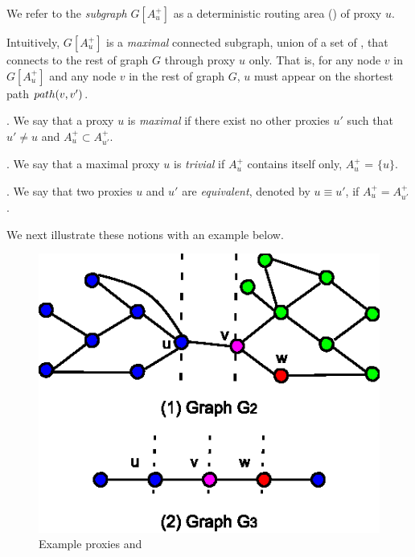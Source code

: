 We refer to the {\em subgraph} $G[A^+_u]$ as a deterministic routing area (\dra) of proxy $u$.

Intuitively, \dra $G[A^+_u]$ is a {\em maximal} connected subgraph, union of a set of \ccs, that connects to the rest of graph $G$ through proxy $u$ only.
That is, for any node $v$ in $G[A^+_u]$ and any node $v$ in the rest of graph $G$, $u$ must appear on the shortest path $\path(v, v')$.

.  We say that a proxy $u$ is {\em maximal} if there exist no other proxies $u'$ such that $u'\ne u$ and $A^+_{u} \subset A^+_{u'}$.

. We say that a maximal proxy $u$ is {\em trivial} if $A^+_u$ contains itself only, \ie $A^+_{u}$ = $\{u\}$.


. We say that two proxies $u$ and $u'$ are {\em equivalent}, denoted by $u\equiv u'$, if $A^+_{u} = A^+_{u'}$.




We next illustrate these notions with an example below.

\begin{figure}
\centering
 \includegraphics[scale=0.95]{./extended-proxies.eps}
 \vspace{-2ex}
 \caption{Example proxies and \dras}
  \label{fig-proxies}
\vspace{-2ex}
\end{figure}


